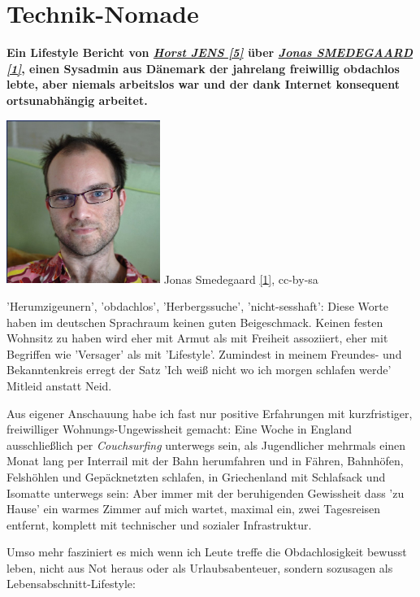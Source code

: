 \section*{Technik-Nomade}
\label{nomad}

\textbf{Ein Lifestyle Bericht von \href{http://spielend-programmieren.at}{\textit{Horst JENS [5]}} \"uber \href{http://dr.jones.dk}{\textit{Jonas SMEDEGAARD [1]}}, einen Sysadmin aus D\"anemark der jahrelang freiwillig obdachlos lebte, aber niemals arbeitslos war und der dank Internet konsequent ortsunabh\"angig arbeitet.}
\begin{center}
\includegraphics[width=5cm]{nomad/nomad-jonas.jpg}
\footnotesize{Jonas Smedegaard \href{http://dr.jones.dk}{{[}1{]}}, cc-by-sa}
\end{center}

'Herumzigeunern', 'obdachlos', 'Herbergssuche', 'nicht-sesshaft': Diese Worte haben im deutschen Sprachraum keinen guten Beigeschmack. Keinen festen Wohnsitz zu haben wird eher mit Armut als mit Freiheit assoziiert, eher mit Begriffen wie 'Versager' als mit 'Lifestyle'. Zumindest in meinem Freundes- und Bekanntenkreis erregt der Satz 'Ich weiß nicht wo ich morgen schlafen werde' Mitleid anstatt Neid.

Aus eigener Anschauung habe ich fast nur positive Erfahrungen mit kurzfristiger, freiwilliger Wohnungs-Ungewissheit gemacht: Eine Woche in England ausschließlich per \textit{Couchsurfing} unterwegs sein, als Jugendlicher mehrmals einen Monat lang per Interrail mit der Bahn herumfahren und in Fähren, Bahnhöfen, Felshöhlen und Gepäcknetzten schlafen, in Griechenland mit Schlafsack und Isomatte unterwegs sein: Aber immer mit der beruhigenden Gewissheit dass 'zu Hause' ein warmes Zimmer auf mich wartet, maximal ein, zwei Tagesreisen entfernt, komplett mit technischer und sozialer Infrastruktur. 

Umso mehr fasziniert es mich wenn ich Leute treffe die Obdachlosigkeit bewusst leben, nicht aus Not heraus oder als Urlaubsabenteuer, sondern sozusagen als Lebensabschnitt-Lifestyle: 

